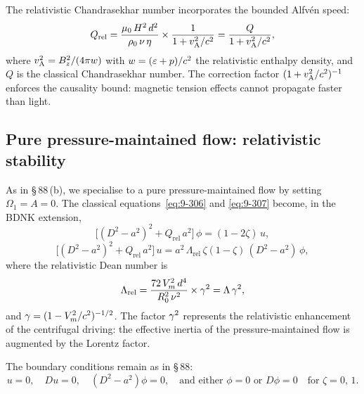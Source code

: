 The relativistic Chandrasekhar number incorporates the bounded Alfv\'en
speed:
\begin{equation}\label{eq:rel-9-90-Qrel}
  Q_{\mathrm{rel}}
  = \frac{\mu_{0}\,H^{2}\,d^{2}}{\rho_{0}\,\nu\,\eta}
  \times \frac{1}{1 + v_{\mathrm{A}}^{2}/c^{2}}
  = \frac{Q}{1 + v_{\mathrm{A}}^{2}/c^{2}},
\end{equation}
where $v_{\mathrm{A}}^{2} = B_{z}^{2}/(4\pi w)$ with
$w = (\varepsilon + p)/c^{2}$ the relativistic enthalpy
density, and $Q$ is the classical Chandrasekhar number.  The
correction factor $(1 + v_{\mathrm{A}}^{2}/c^{2})^{-1}$ enforces the causality
bound: magnetic tension effects cannot propagate faster than light.

\subsection{Pure pressure-maintained flow: relativistic stability}
\label{ssec:rel-9-pure-pressure}

As in \S\,88\,(b), we specialise to a pure pressure-maintained flow
by setting $\Omega_{1} = A = 0$.  The classical equations~\eqref{eq:9-306}
and \eqref{eq:9-307} become, in the BDNK extension,
\begin{equation}\label{eq:rel-9-eq1}
  \bigl[(D^{2} - a^{2})^{2}
  + Q_{\mathrm{rel}}\,a^{2}
  \bigr]\,\phi
  = (1 - 2\zeta)\,u,
\end{equation}
\begin{equation}\label{eq:rel-9-eq2}
  \bigl[(D^{2} - a^{2})^{2}
  + Q_{\mathrm{rel}}\,a^{2}
  \bigr]\,u
  = a^{2}\,\Lambda_{\mathrm{rel}}\,\zeta(1-\zeta)\,
  (D^{2} - a^{2})\,\phi,
\end{equation}
where the relativistic Dean number is
\begin{equation}\label{eq:rel-9-Lambda-rel}
  \Lambda_{\mathrm{rel}}
  = \frac{72\,V_{m}^{2}\,d^{4}}{R_{0}^{2}\,\nu^{2}}
  \times \gamma^{2}
  = \Lambda\,\gamma^{2},
\end{equation}
and $\gamma = (1 - V_{m}^{2}/c^{2})^{-1/2}$.  The factor $\gamma^{2}$
represents the relativistic enhancement of the centrifugal driving:
the effective inertia of the pressure-maintained flow is augmented by
the Lorentz factor.

The boundary conditions remain as in \S\,88:
\begin{equation}\label{eq:rel-9-BC}
  u = 0, \quad Du = 0, \quad (D^{2}-a^{2})\phi = 0,
  \quad \text{and either } \phi = 0 \text{ or } D\phi = 0
  \quad \text{for } \zeta = 0,\,1.
\end{equation}

